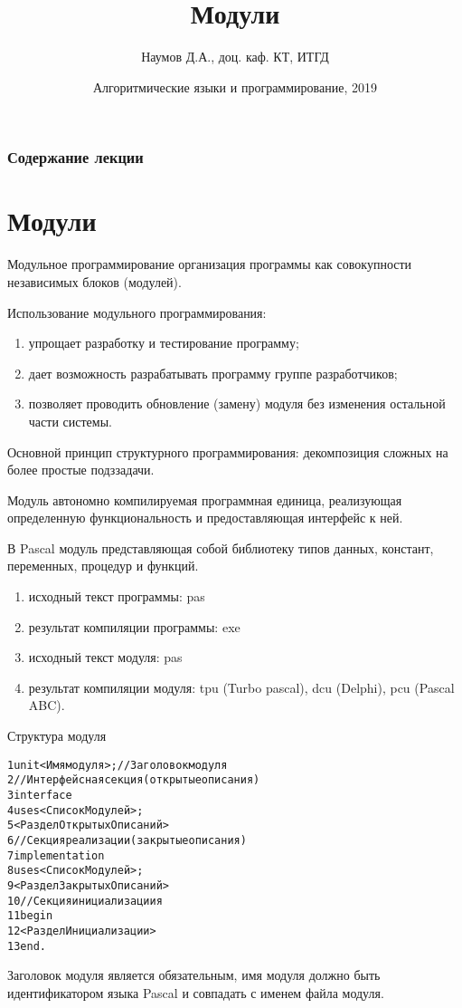 \documentclass{beamer}
\title[Модули]{Модули}
\author{Наумов Д.А., доц. каф. КТ, ИТГД }
\date[01.04.2019] {Алгоритмические языки и программирование, 2019}
\begin{document}
\begin{frame}
  \titlepage
\end{frame}
  
\begin{frame}
  \frametitle{Содержание лекции}
  \tableofcontents  
\end{frame}
  
\section{Модули}

\begin{frame}
\begin{block}{Модульное программирование}
организация программы как совокупности независимых блоков (модулей).
\end{block}
Использование модульного программирования:
\begin{enumerate}
\item упрощает разработку и тестирование программу;
\item дает возможность разрабатывать программу группе разработчиков;
\item позволяет проводить обновление (замену) модуля без изменения остальной части системы.
\end{enumerate}
Основной принцип структурного программирования: декомпозиция сложных на более простые подззадачи.
\end{frame} 

\begin{frame}
\begin{block}{Модуль}
автономно компилируемая программная единица, реализующая определенную функциональность
и предоставляющая интерфейс к ней.
\end{block}
В Pascal модуль представляющая собой библиотеку типов данных, констант, переменных, процедур и функций.
\begin{enumerate}
\item исходный текст программы: pas
\item результат компиляции программы: exe
\item исходный текст модуля: pas
\item результат компиляции модуля: tpu (Turbo pascal), dcu (Delphi), pcu (Pascal ABC).
\end{enumerate}
\end{frame} 

\begin{frame}[fragile]{Структура модуля}
\begin{alltt}
 1 unit <Имя модуля>;//Заголовок модуля 	
 2 //Интерфейсная секция (открытые описания)
 3   interface 
 4	    uses <СписокМодулей>; 
 5	    <РазделОткрытыхОписаний>
 6 //Секция реализации (закрытые описания)
 7   implementation 
 8	    uses <СписокМодулей>;  
 9	    <РазделЗакрытыхОписаний>
10 //Секция инициализациия
11   begin
12	    <РазделИнициализации>
13   end.
\end{alltt}
Заголовок модуля является обязательным, имя модуля должно быть идентификатором языка Pascal и совпадать с именем файла модуля.
\end{frame}
\end{document}
